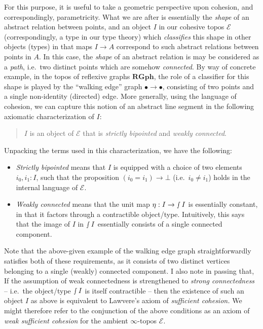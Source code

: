\documentclass[
  12pt]{article}
\providecommand{\tightlist}{%
  \setlength{\itemsep}{0pt}\setlength{\parskip}{0pt}}
\begin{document}
For this purpose, it is useful to take a geometric perspective upon
cohesion, and correspondingly, parametricity. What we are after is
essentially the \emph{shape} of an abstract relation between points, and
an object \(I\) in our cohesive topos \(\mathcal{E}\) (correspondingly,
a type in our type theory) which \emph{classifies} this shape in other
objects (types) in that maps \(I \to A\) correspond to such abstract
relations between points in \(A\). In this case, the \emph{shape} of an
abstract relation is may be considered as a \emph{path}, i.e.~two
distinct points which are somehow \emph{connected}. By way of concrete
example, in the topos of reflexive graphs \(\mathbf{RGph}\), the role of
a classifier for this shape is played by the ``walking edge'' graph
\(\bullet \to \bullet\), consisting of two points and a single
non-identity (directed) edge. More generally, using the language of
cohesion, we can capture this notion of an abstract line segment in the
following axiomatic characterization of \(I\):

\begin{quote}
\(I\) is an object of \(\mathcal{E}\) that is \emph{strictly bipointed}
and \emph{weakly connected}.
\end{quote}

Unpacking the terms used in this characterization, we have the
following:

\begin{itemize}
\tightlist
\item
  \emph{Strictly bipointed} means that \(I\) is equipped with a choice
  of two elements \(i_0, i_1 : I\), such that the proposition
  \((i_0 = i_1) \to \bot\) (i.e.~\(i_0 \neq i_1\)) holds in the internal
  language of \(\mathcal{E}\).
\item
  \emph{Weakly connected} means that the unit map
  \(\eta : I \to \smallint I\) is essentially constant, in that it
  factors through a contractible object/type. Intuitively, this says
  that the image of \(I\) in \(\smallint I\) essentially consists of a
  single connected component.
\end{itemize}

Note that the above-given example of the walking edge graph
straightforwardly satisfies both of these requirements, as it consists
of two distinct vertices belonging to a single (weakly) connected
component. I also note in passing that, If the assumption of weak
connectedness is strengthened to \emph{strong connectedness} -- i.e.~the
object/type \(\smallint I\) is itself contractible -- then the existence
of such an object \(I\) as above is equivalent to Lawvere's axiom of
\emph{sufficient cohesion.} We might therefore refer to the conjunction
of the above conditions as an axiom of \emph{weak sufficient cohesion}
for the ambient \(\infty\)-topos \(\mathcal{E}\).
\end{document}

